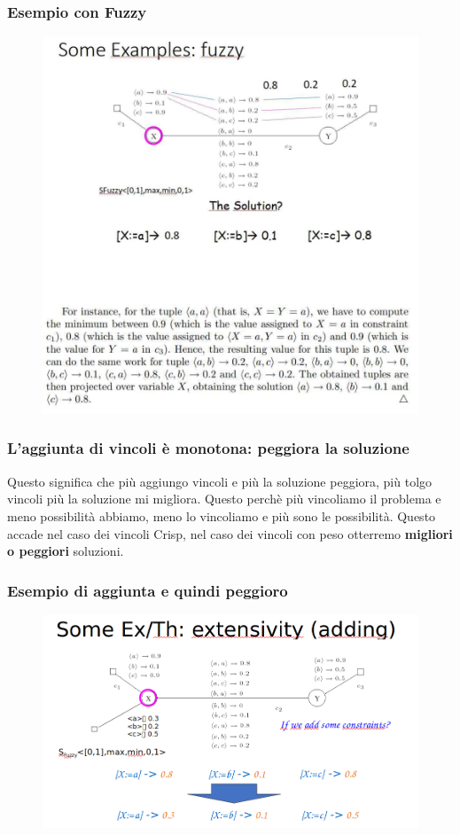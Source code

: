 \subsubsection{Esempio con Fuzzy}
\begin{figure}[htp]
	\centering
    \includegraphics[width=14cm, keepaspectratio]{img/Cap4/fuzzy.png}
\end{figure}

\newpage
\subsubsection{L’aggiunta di vincoli è monotona: peggiora la soluzione}
Questo significa che più aggiungo vincoli e più la soluzione peggiora, più tolgo vincoli più la soluzione mi migliora. Questo perchè più vincoliamo il problema e meno possibilità abbiamo, meno lo vincoliamo e più sono le possibilità. Questo accade nel caso dei vincoli Crisp, nel caso dei vincoli con peso otterremo \textbf{migliori o peggiori} soluzioni.
\subsubsection{Esempio di aggiunta e quindi peggioro}
\begin{figure}[htp]
	\centering
    \includegraphics[width=12.5cm, keepaspectratio]{img/Cap4/worst2.png}
\end{figure}

